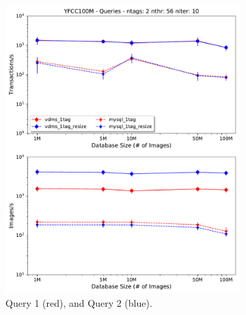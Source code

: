 \begin{figure}[ht]
\begin{subfigure}{.5\linewidth}
  \centering
  \includegraphics[width=\columnwidth]{figures/queries_throughput_56_q1_q2}
  \caption{Query 1 (red), and Query 2 (blue).}
  \label{fig:q1_q2}
\end{subfigure}
\begin{subfigure}{.5\linewidth}
  \centering

\end{subfigure}
\end{figure}
